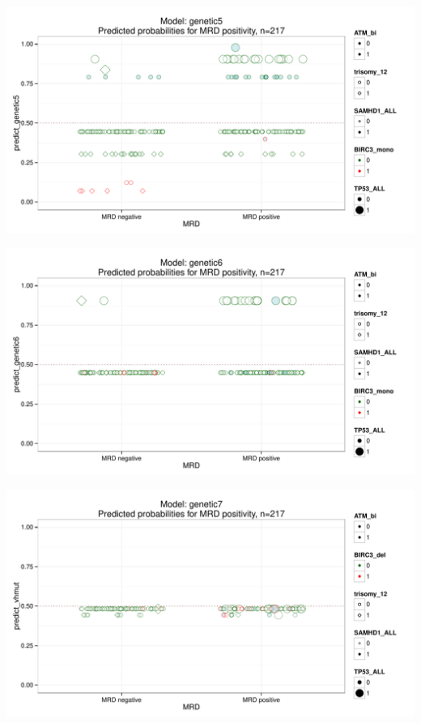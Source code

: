 \documentclass[a4paper,11pt]{article}
\begin{document}
\includegraphics{HICF1_Finalreportv6-genetic5}

\includegraphics{HICF1_Finalreportv6-genetic6}

\includegraphics{HICF1_Finalreportv6-vhmut}
\end{document}
